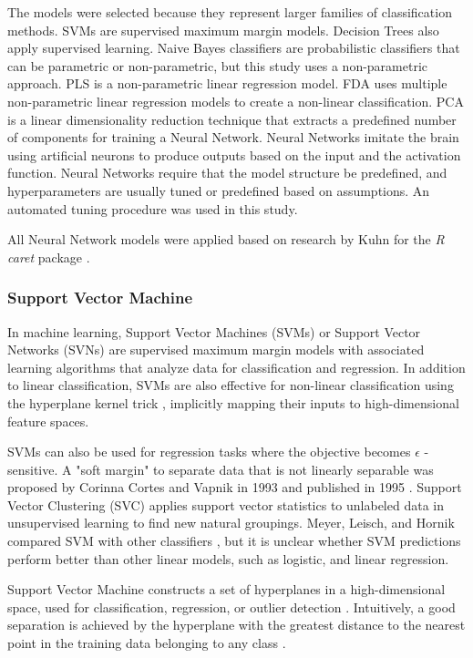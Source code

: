 \documentclass[sn-mathphys-num]{sn-jnl}%
\begin{document}
The models were selected because they represent larger families of classification methods. SVMs are supervised maximum margin models. Decision Trees also apply supervised learning. Naive Bayes classifiers are probabilistic classifiers that can be parametric or non-parametric, but this study uses a non-parametric approach. PLS is a non-parametric linear regression model. FDA uses multiple non-parametric linear regression models to create a non-linear classification. PCA is a linear dimensionality reduction technique that extracts a predefined number of components for training a Neural Network. Neural Networks imitate the brain using artificial neurons to produce outputs based on the input and the activation function. Neural Networks require that the model structure be predefined, and hyperparameters are usually tuned or predefined based on assumptions. An automated tuning procedure was used in this study.

All Neural Network models were applied based on research by Kuhn for the \textit{R} \textit{caret} package \cite{kuhn2013applied, topepoCaretPackage, rprojectProjectStatistical}.

\subsubsection{Support Vector Machine}

In machine learning, Support Vector Machines (SVMs) or Support Vector Networks (SVNs) are supervised maximum margin models with associated learning algorithms that analyze data for classification and regression. In addition to linear classification, SVMs are also effective for non-linear classification using the hyperplane kernel trick \cite{Boser1992}, implicitly mapping their inputs to high-dimensional feature spaces.

SVMs can also be used for regression tasks where the objective becomes $\epsilon$ -sensitive. A "soft margin" to separate data that is not linearly separable was proposed by Corinna Cortes and Vapnik in 1993 and published in 1995 \cite{Cortes1995}. Support Vector Clustering \cite{BenHur2001} (SVC) applies support vector statistics to unlabeled data in unsupervised learning to find new natural groupings. Meyer, Leisch, and Hornik compared SVM with other classifiers \cite{Meyer2003}, but it is unclear whether SVM predictions perform better than other linear models, such as logistic, and linear regression.

Support Vector Machine constructs a set of hyperplanes in a high-dimensional space, used for classification, regression, or outlier detection \cite{developers2023}. Intuitively, a good separation is achieved by the hyperplane with the greatest distance to the nearest point in the training data belonging to any class \cite{Hastie2009}.
\end{document}

